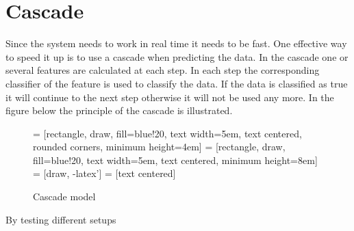 \chapter{Cascade}
\label{sec:Cascade}
Since the system needs to work in real time it needs to be fast. One effective way to speed it up is to use a cascade when predicting the data. In the cascade one or several features are calculated at each step. In each step the corresponding classifier of the feature is used to classify the data. If the data is classified as true it will continue to the next step otherwise it will not be used any more. In the figure below the principle of the cascade is illustrated.

\begin{figure}[H]
\centering
{} = [rectangle, draw, fill=blue!20, 
    text width=5em, text centered, rounded corners, minimum height=4em]
 = [rectangle, draw, fill=blue!20, 
    text width=5em, text centered, minimum height=8em]
 = [draw, -latex']
 = [text centered]

\caption{Cascade model}
\label{Cascade}
\end{figure}

By testing different setups 

